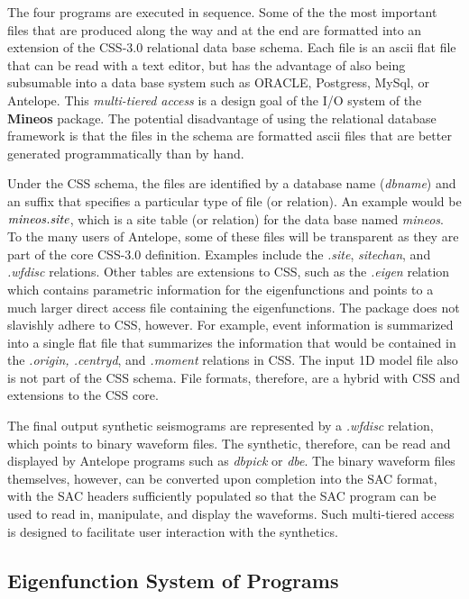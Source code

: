 \documentclass[11pt]{article}
\begin{document}
The four programs are executed in sequence.
Some of the the most important files that are produced along the way 
and at the end are formatted into an extension of the CSS-3.0 relational
data base schema. Each file is an ascii flat file that can be read
with a text editor, but has the advantage of also being subsumable into
a data base system such as ORACLE, Postgress, MySql, or Antelope. 
This {\it multi-tiered access} is a design goal of the I/O system
of the {\bf Mineos} package. The potential disadvantage of using
the relational database framework is that the files in the schema
are formatted ascii files that are better generated programmatically
than by hand.

Under the CSS schema, the files are identified by a database 
name ({\it dbname}) and an
suffix that specifies a particular type of file (or relation). An
example would be ${\it mineos.site}$, which is a site table (or
relation) for the data base named {\it mineos}. To
the many users of Antelope, some of these files will be transparent as
they are part of the core CSS-3.0 definition. Examples include
the {\it .site}, {\it sitechan}, and {\it .wfdisc} relations. Other
tables are extensions to CSS, such as the {\it .eigen} relation which
contains parametric information for the eigenfunctions and points to
a much larger direct access file containing the eigenfunctions.
The package does not slavishly adhere to CSS, however. For example,
event information is summarized into a single flat file that summarizes
the information that would be contained in
the {\it .origin, .centryd}, and {\it .moment} relations in
CSS. The input 1D model file also is not part of the CSS schema.
File formats, therefore, are a hybrid with CSS and extensions
to the CSS core.

The final output synthetic seismograms are represented by a {\it .wfdisc}
relation, which points to binary waveform files. The synthetic, therefore,
can be read and displayed by Antelope programs such as {\it dbpick} or
{\it dbe}. The binary waveform files themselves, however, can be
converted upon completion into the SAC format,
with the SAC headers sufficiently populated so that the SAC program can
be used to read in, manipulate, and display the waveforms. Such
multi-tiered access is designed to facilitate user interaction with the
synthetics.

\subsection{Eigenfunction System of Programs}
\end{document}
